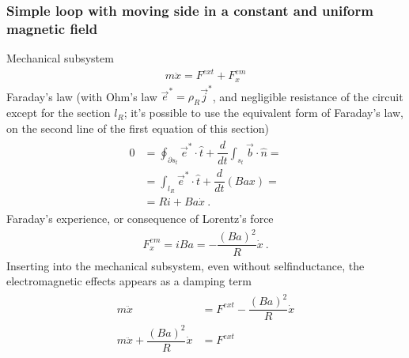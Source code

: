 \documentclass[letterpaper,10pt,english]{jupyterBook}
\begin{document}
\subsubsection{Simple loop with moving side in a constant and uniform magnetic field}
\label{\detokenize{ch/systems-electromechanic-induction-intro:simple-loop-with-moving-side-in-a-constant-and-uniform-magnetic-field}}
\sphinxAtStartPar
Mechanical sub\sphinxhyphen{}system
\begin{equation*}
\begin{split}m \ddot{x} = F^{ext} + F^{em}_x\end{split}
\end{equation*}
\sphinxAtStartPar
Faraday’s law (with Ohm’s law \(\vec{e}^* = \rho_R \vec{j}^*\), and negligible resistance of the circuit except for the section \(l_R\); it’s possible to use the equivalent form of Faraday’s law, on the second line of the first equation of this section)
\begin{equation*}
\begin{split}\begin{aligned}
  0 
  & = \oint_{\partial s_t} \vec{e}^* \cdot \hat{t} + \dfrac{d}{dt} \int_{s_t} \vec{b} \cdot \hat{n} = \\
  & = \int_{l_R} \vec{e}^* \cdot \hat{t} + \dfrac{d}{dt} \left( B a x \right) = \\
  & = R i + B a \dot{x} \ .
\end{aligned}\end{split}
\end{equation*}
\sphinxAtStartPar
Faraday’s experience, or consequence of Lorentz’s force
\begin{equation*}
\begin{split}F^{em}_x = i B a = - \dfrac{(B a)^2}{R} \dot{x} \ .\end{split}
\end{equation*}
\sphinxAtStartPar
Inserting into the mechanical sub\sphinxhyphen{}system, even without self\sphinxhyphen{}inductance, the electromagnetic effects appears as a damping term
\begin{equation*}
\begin{split}\begin{aligned}
  m \ddot{x} & = F^{ext} - \dfrac{(B a)^2}{R} \dot{x} \\ 
  m \ddot{x} + \dfrac{(B a)^2}{R} \dot{x} & = F^{ext} \\ 
\end{aligned}\end{split}
\end{equation*}
\end{document}
